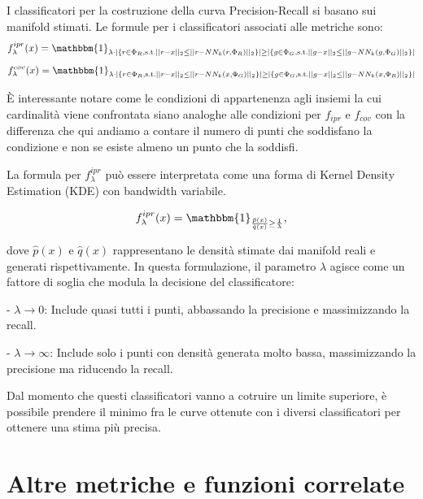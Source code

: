 I classificatori per la costruzione della curva Precision-Recall si basano sui manifold stimati. Le formule per i classificatori associati alle metriche sono:
\begin{equation}
    f_{\lambda}^{ipr}(x) = \mathbbm{1}_{\lambda \cdot |\{ r \in \Phi_R, \text{s.t.} ||r - x||_2 \leq ||r - NN_k(r, \Phi_R)||_2 \}| \geq |\{ g \in \Phi_G, \text{s.t.} ||g - x||_2 \leq ||g - NN_k(g, \Phi_G)||_2 \}|}
\end{equation}
\begin{equation}
    f_{\lambda}^{cov}(x) = \mathbbm{1}_{\lambda \cdot |\{ r \in \Phi_R, \text{s.t.} ||r - x||_2 \leq ||r - NN_k(x, \Phi_G)||_2 \}| \geq |\{ g \in \Phi_G, \text{s.t.} ||g - x||_2 \leq ||g - NN_k(x, \Phi_R)||_2 \}|}
\end{equation}

È interessante notare come le condizioni di appartenenza agli insiemi la cui cardinalità viene confrontata siano analoghe alle condizioni per \(f_{ipr}\) e \(f_{cov}\) con la differenza che qui andiamo a contare il numero di punti che soddisfano la condizione e non se esiste almeno un punto che la soddisfi.

La formula per \(f_{\lambda}^{ipr}\) può essere interpretata come una forma di Kernel Density Estimation (KDE) con bandwidth variabile.

\begin{equation}
    f_{\lambda}^{ipr}(x) = \mathbbm{1}_{\frac{\hat{p}(x)}{\hat{q}(x)} \geq \frac{1}{\lambda}},
\end{equation}

dove \(\hat{p}(x)\) e \(\hat{q}(x)\) rappresentano le densità stimate dai manifold reali e generati rispettivamente. In questa formulazione, il parametro \(\lambda\) agisce come un fattore di soglia che modula la decisione del classificatore:  

- \(\lambda \to 0\): Include quasi tutti i punti, abbassando la precisione e massimizzando la recall.  

- \(\lambda \to \infty\): Include solo i punti con densità generata molto bassa, massimizzando la precisione ma riducendo la recall.

Dal momento che questi classificatori vanno a cotruire un limite superiore, è possibile prendere il minimo fra le curve ottenute con i diversi classificatori per ottenere una stima più precisa.

\section{Altre metriche e funzioni correlate}
\label{sec:altre-metriche}

